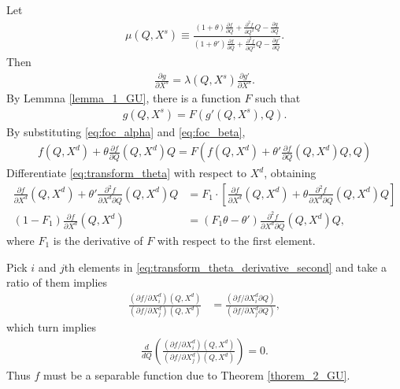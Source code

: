 \documentclass[11pt, a4paper]{article}
\theoremstyle{remark}
\begin{document}
Let
\begin{align}
    \mu(Q,X^{s}) \equiv \frac{(1+\theta)\frac{\partial f}{\partial Q} + \frac{\partial^2 f}{\partial Q^2}Q - \frac{\partial g}{\partial Q}}{(1+\theta')\frac{\partial f}{\partial Q} + \frac{\partial^2 f}{\partial Q^2}Q - \frac{\partial g'}{\partial Q}}.
\end{align}
Then 
\begin{align}
    \frac{\partial g}{\partial X^{s}} = \lambda(Q, X^{s}) \frac{\partial g'}{\partial X^{s}}. \label{eq:transformation_g}
\end{align}
By Lemmna \ref{lemma_1_GU}, there is a function $F$ such that
\begin{align}
    g(Q,X^{s}) = F(g'(Q,X^{s}), Q).
\end{align}
By substituting \eqref{eq:foc_alpha} and \eqref{eq:foc_beta},
\begin{align}
    f(Q, X^{d}) + \theta \frac{\partial f}{\partial Q}(Q, X^{d})Q  = F\left(f(Q, X^{d}) + \theta' \frac{\partial f}{\partial Q}(Q, X^{d})Q, Q \right) \label{eq:transform_theta}
\end{align}
Differentiate \eqref{eq:transform_theta} with respect to $X^{d}$, obtaining
\begin{align}
\frac{\partial f}{\partial X^{d}}(Q, X^{d}) + \theta' \frac{\partial^2 f}{\partial X^{d} \partial Q}(Q, X^{d})Q &= F_{1} \cdot \left[\frac{\partial f}{\partial X^{d}}(Q, X^{d}) + \theta \frac{\partial^2 f}{\partial X^{d} \partial Q}(Q, X^{d})Q\right]\label{eq:transform_theta_derivative_first}\\
(1 - F_{1}) \frac{\partial f}{\partial X^{d}}(Q, X^{d}) & = (F_{1} \theta - \theta')\frac{\partial^2 f}{\partial X^{d} \partial Q}(Q, X^{d})Q,\label{eq:transform_theta_derivative_second}
\end{align}
where $F_1$ is the derivative of $F$ with respect to the first element. 

Pick $i$ and $j$th elements in \eqref{eq:transform_theta_derivative_second} and take a ratio of them implies
\begin{align}
\frac{(\partial f/\partial X^{d}_{i})(Q, X^{d})}{(\partial f/\partial X^{d}_{j})(Q, X^{d})} & = \frac{(\partial f/\partial X^{d}_{i} \partial Q)}{(\partial f/\partial X^{d}_{j} \partial Q)},\label{eq:ratio_foc}
\end{align}
which turn implies
\begin{align}
    \frac{d}{dQ}\left(\frac{(\partial f/\partial X^{d}_{i})(Q, X^{d})}{(\partial f/\partial X^{d}_{j})(Q, X^{d})}\right) =0.\label{eq:derivative_separable}
\end{align}
Thus $f$ must be a separable function due to Theorem \ref{thorem_2_GU}.
\end{document}
